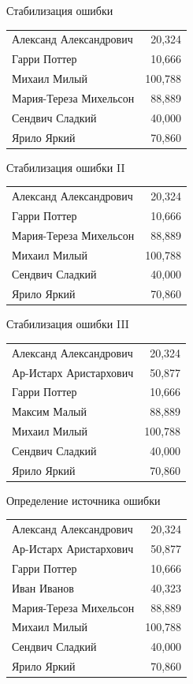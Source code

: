 \documentclass[10pt,pdf,hyperref={unicode}]{beamer}%
\begin{document}
\begin{frame}{Стабилизация ошибки}
\begin{tabular}{lr}
Александ Александрович & 20,324 \\
Гарри Поттер               &   10,666 \\
Михаил Милый           &  100,788 \\
Мария-Тереза Михельсон           &   88,889 \\
Сендвич Сладкий      &   40,000 \\
Ярило Яркий           &   70,860 \\
\end{tabular}
\end{frame}


\begin{frame}{Стабилизация ошибки II}
\begin{tabular}{lr}
Александ Александрович & 20,324 \\
Гарри Поттер               &   10,666 \\
Мария-Тереза Михельсон           &   88,889 \\
Михаил Милый           &  100,788 \\
Сендвич Сладкий      &   40,000 \\
Ярило Яркий           &   70,860 \\
\end{tabular}
\end{frame}

\begin{frame}{Стабилизация ошибки III}

\begin{tabular}{lr}
Александ Александрович & 20,324 \\
Ар-Истарх Аристархович  &   50,877 \\
Гарри Поттер               &   10,666 \\
Максим Малый           &   88,889 \\
Михаил Милый           &  100,788 \\
Сендвич Сладкий      &   40,000 \\
Ярило Яркий           &   70,860 \\
\end{tabular}

\end{frame}


\begin{frame}{Определение источника ошибки}
\begin{tabular}{lr}
Александ Александрович & 20,324 \\
Ар-Истарх Аристархович  &   50,877 \\
Гарри Поттер               &   10,666 \\
Иван Иванов           & 40,323\\
Мария-Тереза Михельсон           &   88,889 \\
Михаил Милый           &  100,788 \\
Сендвич Сладкий      &   40,000 \\
Ярило Яркий           &   70,860 \\
\end{tabular}
\end{frame}
\end{document}

